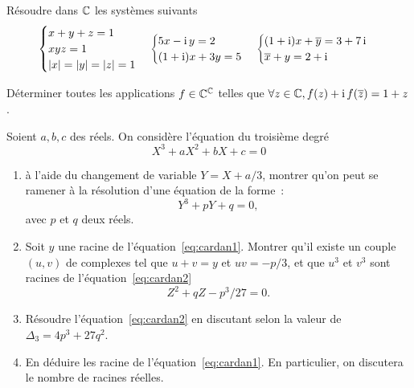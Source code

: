 \begin{exercice}
    Résoudre dans \(\mathbb{C}\) les systèmes suivants
    \begin{equation}
        \begin{cases} x + y + z = 1 \\ xyz = 1 \\ \left\lvert x\right\rvert = \left\lvert y\right\rvert = \left\lvert z\right\rvert = 1 \end{cases}
        \begin{cases} 5x-\operatorname{i}{}y = 2 \\ (1 + \operatorname{i})x + 3y = 5 \end{cases}
        \begin{cases} (1 + \operatorname{i})x + \overline{y} = 3 + 7\operatorname{i} \\\overline{x} + y = 2 + \operatorname{i}\end{cases}
    \end{equation}
\end{exercice}

\begin{exercice}
    Déterminer toutes les applications \(f \in \mathbb{C}^{\mathbb{C}}\) telles que \(\forall z 
    \in \mathbb{C}, f(z) + \operatorname{i} f(\overline{z}) = 1 + z\).
\end{exercice}

\begin{exercice}
    Soient \(a, b, c\) des réels. On considère l'équation du troisième degré
    \begin{equation}
        X^3 + aX^2 + bX + c = 0
    \end{equation}
    \begin{enumerate}
        \item à l'aide du changement de variable \(Y = X + a/3\), montrer qu'on 
            peut se ramener à la résolution d'une équation de la forme~:
            \begin{equation}
                \label{eq:cardan1}
                Y^3 + pY + q = 0,
            \end{equation}
            avec \(p\) et \(q\) deux réels.
        \item Soit \(y\) une racine de l'équation~\eqref{eq:cardan1}. Montrer 
            qu'il existe un couple \((u,v)\) de complexes tel que \(u + v = y\) et 
            \(uv = -p/3\), et que \(u^3\) et \(v^3\) sont racines de 
            l'équation~\eqref{eq:cardan2}
            \begin{equation}
                \label{eq:cardan2}
                Z^2 + qZ-p^3/27 = 0.
            \end{equation}
        \item Résoudre l'équation~\eqref{eq:cardan2} en discutant selon la 
            valeur de \(\Delta_3 = 4p^3 + 27q^2\).
        \item En déduire les racine de l'équation~\eqref{eq:cardan1}. En 
            particulier, on discutera le nombre de racines réelles.
    \end{enumerate}
\end{exercice}
